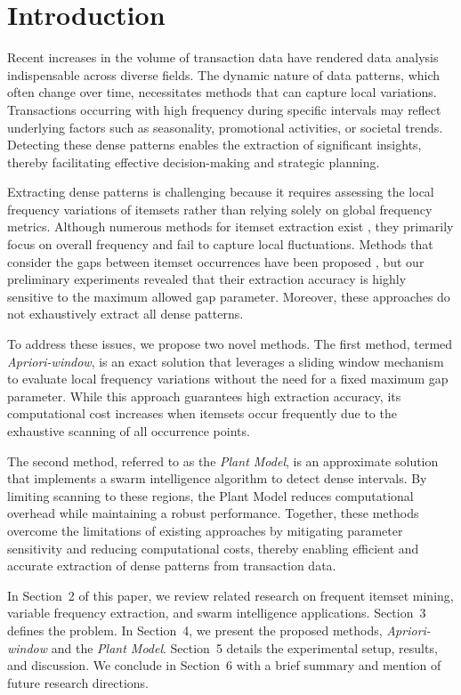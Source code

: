 \section{Introduction}
\label{introduction}

Recent increases in the volume of transaction data have rendered data analysis indispensable across diverse fields. The dynamic nature of data patterns, which often change over time, necessitates methods that can capture local variations. Transactions occurring with high frequency during specific intervals may reflect underlying factors such as seasonality, promotional activities, or societal trends. Detecting these dense patterns enables the extraction of significant insights, thereby facilitating effective decision-making and strategic planning.

Extracting dense patterns is challenging because it requires assessing the local frequency variations of itemsets rather than relying solely on global frequency metrics. Although numerous methods for itemset extraction exist \cite{agrawal1994fast}\cite{zaki1997new}\cite{han2000mining}, they primarily focus on overall frequency and fail to capture local fluctuations. Methods that consider the gaps between itemset occurrences have been proposed \cite{tanbeer2009discovering}\cite{kiran2017discovering}\cite{mahanta2005finding}\cite{fournier2021mining}, but our preliminary experiments revealed that their extraction accuracy is highly sensitive to the maximum allowed gap parameter. Moreover, these approaches do not exhaustively extract all dense patterns.

To address these issues, we propose two novel methods. The first method, termed \emph{Apriori-window}, is an exact solution that leverages a sliding window mechanism to evaluate local frequency variations without the need for a fixed maximum gap parameter. While this approach guarantees high extraction accuracy, its computational cost increases when itemsets occur frequently due to the exhaustive scanning of all occurrence points.

The second method, referred to as the \emph{Plant Model}, is an approximate solution that implements a swarm intelligence algorithm to detect dense intervals. By limiting scanning to these regions, the Plant Model reduces computational overhead while maintaining a robust performance. Together, these methods overcome the limitations of existing approaches by mitigating parameter sensitivity and reducing computational costs, thereby enabling efficient and accurate extraction of dense patterns from transaction data.

In Section 2 of this paper, we review related research on frequent itemset mining, variable frequency extraction, and swarm intelligence applications. Section 3 defines the problem. In Section 4, we present the proposed methods, \emph{Apriori-window} and the \emph{Plant Model}. Section 5 details the experimental setup, results, and discussion. We conclude in Section 6 with a brief summary and mention of future research directions.

